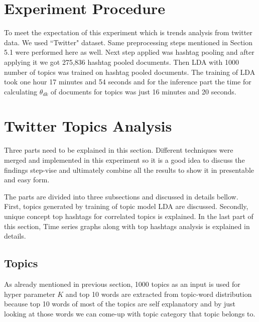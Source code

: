 \documentclass[a4paper]{report}
\begin{document}
\section{Experiment Procedure}
To meet the expectation of this experiment which is trends analysis from twitter data. We used ``Twitter" dataset. Same preprocessing steps mentioned in Section 5.1 were performed here as well. Next step applied was hashtag pooling and after applying it we got 275,836 hashtag pooled documents. Then LDA with 1000 number of topics was trained on hashtag pooled documents. The training of LDA took one hour 17 minutes and 54 seconds and for the inference part the time for calculating $\theta_{dk}$ of documents for topics was just 16 minutes and 20 seconds.

\section{Twitter Topics Analysis}
Three parts need to be explained in this section. Different techniques were merged and implemented in this experiment so it is a good idea to discuss the findings step-vise and ultimately combine all the results to show it in presentable and easy form.

The parts are divided into three subsections and discussed in details bellow. First, topics generated by training of topic model LDA are discussed. Secondly, unique concept top hashtags for correlated topics is explained. In the last part of this section, Time series graphs along with top hashtags analysis is explained in details.

\subsection{Topics}
As already mentioned in previous section, 1000 topics as an input is used for hyper parameter $K$ and top 10 words are extracted from topic-word distribution because top 10 words of most of the topics are self explanatory and by just looking at those words we can come-up with topic category that topic belongs to.
\end{document}
